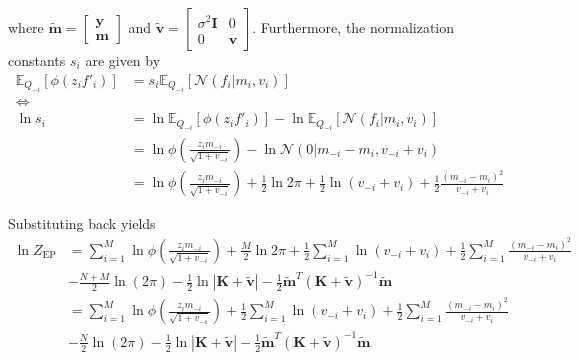 \documentclass[10pt,a4paper]{article}
\begin{document}
where $\tilde{\bm{m}} = \begin{bmatrix}\bm{y}\\\bm{m}\end{bmatrix}$ and $\tilde{\bm{v}}=\begin{bmatrix}\sigma^2 \bm{I}&0\\0&\bm{v}\end{bmatrix}$. Furthermore, the normalization constants $s_i$ are given by
\begin{align}
	\mathbb{E}_{Q_{-i}}\left[\phi\left(z_i f'_i\right)\right] &= s_i \mathbb{E}_{Q_{-i}}\left[\mathcal{N}\left(f_i|m_i, v_i\right)\right] \\
	\iff &\nonumber\\
	\ln s_i &= \ln \mathbb{E}_{Q_{-i}}\left[\phi\left(z_i f'_i\right)\right] - \ln \mathbb{E}_{Q_{-i}}\left[\mathcal{N}\left(f_i|m_i, v_i\right)\right]\\
	&= \ln \phi\left(\frac{z_i m_{-i}}{\sqrt{1 + v_{-i}}}\right) - \ln \mathcal{N}\left(0|m_{-i} - m_i, v_{-i} + v_i\right)\\	
	&= \ln \phi\left(\frac{z_i m_{-i}}{\sqrt{1 + v_{-i}}}\right) +\frac12 \ln2\pi + \frac12 \ln\left(v_{-i} + v_i\right) + \frac12\frac{(m_{-i} - m_i)^2}{v_{-i} + v_i} 
\end{align}

Substituting back yields
\begin{align}
	\ln Z_{\text{EP}} &=  \sum_{i=1}^M \ln \phi\left(\frac{z_i m_{-i}}{\sqrt{1 + v_{-i}}}\right) +\frac{M}{2} \ln2\pi + \frac12 \sum_{i=1}^M\ln\left(v_{-i} + v_i\right) + \frac12\sum_{i=1}^M\frac{(m_{-i} - m_i)^2}{v_{-i} + v_i} \nonumber\\
	& - \frac{N+M}{2}\ln\left(2\pi\right) - \frac{1}{2}\ln|\bm{K} + \tilde{\bm{v}}| - \frac12 \tilde{\bm{m}}^T \left(\bm{K} + \tilde{\bm{v}}\right)^{-1} \tilde{\bm{m}}\\
	&=  \sum_{i=1}^M \ln \phi\left(\frac{z_i m_{-i}}{\sqrt{1 + v_{-i}}}\right) + \frac12 \sum_{i=1}^M\ln\left(v_{-i} + v_i\right) + \frac12\sum_{i=1}^M\frac{(m_{-i} - m_i)^2}{v_{-i} + v_i} \nonumber\\
	& - \frac{N}{2}\ln\left(2\pi\right) - \frac{1}{2}\ln|\bm{K} + \tilde{\bm{v}}| - \frac12 \tilde{\bm{m}}^T \left(\bm{K} + \tilde{\bm{v}}\right)^{-1} \tilde{\bm{m}}\\
\end{align}
\end{document}
